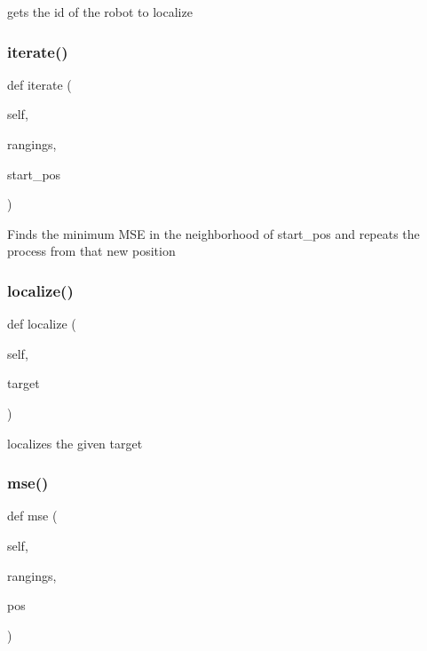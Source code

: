 \begin{DoxyVerb}gets the id of the robot to localize\end{DoxyVerb}
 \mbox{\label{classworld_1_1_world_a68d603f9d2b9759ddca06127f0899689}} 
\subsubsection{\texorpdfstring{iterate()}{iterate()}}
{\footnotesize\ttfamily def iterate (\begin{DoxyParamCaption}\item[{}]{self,  }\item[{}]{rangings,  }\item[{}]{start\+\_\+pos }\end{DoxyParamCaption})}

\begin{DoxyVerb}Finds the minimum MSE in the neighborhood of start_pos and repeats the process from that new position\end{DoxyVerb}
 \mbox{\label{classworld_1_1_world_a5b503b944cc95fd96a0e04f48e8c46fc}} 
\subsubsection{\texorpdfstring{localize()}{localize()}}
{\footnotesize\ttfamily def localize (\begin{DoxyParamCaption}\item[{}]{self,  }\item[{}]{target }\end{DoxyParamCaption})}

\begin{DoxyVerb}localizes the given target\end{DoxyVerb}
 \mbox{\label{classworld_1_1_world_a5c63acf39eabba08715324da0d0ba2bd}} 
\subsubsection{\texorpdfstring{mse()}{mse()}}
{\footnotesize\ttfamily def mse (\begin{DoxyParamCaption}\item[{}]{self,  }\item[{}]{rangings,  }\item[{}]{pos }\end{DoxyParamCaption})}

